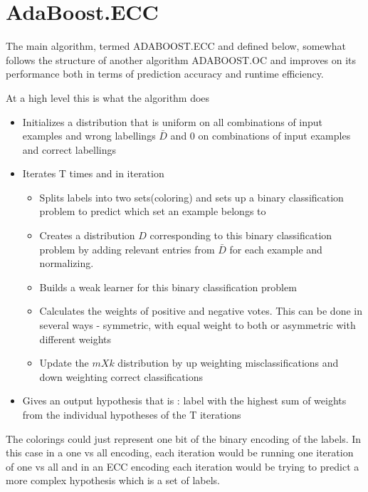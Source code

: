 \documentclass[11pt]{article}
\begin{document}
\section{AdaBoost.ECC}
The main algorithm, termed ADABOOST.ECC and defined below, somewhat follows the structure of another algorithm ADABOOST.OC and improves on its performance both in terms of prediction accuracy and runtime efficiency.

At a high level this is what the algorithm does
\begin{itemize}
\item Initializes a distribution that is uniform on all combinations of input examples and wrong labellings $\bar D$ and 0 on combinations of input examples and correct labellings
\item Iterates T times and in iteration
\begin{itemize}
\item Splits labels into two sets(coloring) and sets up a binary classification problem to predict which set an example belongs to
\item Creates a distribution $D$ corresponding to this binary classification problem by adding relevant entries from $\bar D$ for each example and normalizing.
\item Builds a weak learner for this binary classification problem
\item Calculates the weights of positive and negative votes. This can be done in several ways - symmetric, with equal weight to both or asymmetric with different weights
\item Update the $m X k$ distribution by up weighting misclassifications and down weighting correct classifications
\end{itemize}
\item Gives an output hypothesis that is : label with the highest sum of weights from the individual hypotheses of the T iterations
\end{itemize}

The colorings could just represent one bit of the binary encoding of the labels. In this case in a one vs all encoding, each iteration would be running one iteration of one vs all and in an ECC encoding each iteration would be trying to predict a more complex hypothesis which is a set of labels.
\end{document}
